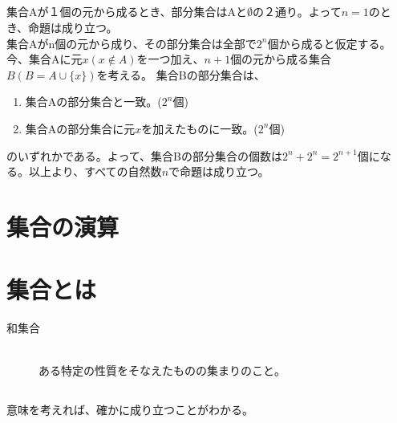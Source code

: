 \documentclass{jsarticle}
\begin{document}
\subsection{}
集合Aが１個の元から成るとき、部分集合はAと$\emptyset$の２通り。よって$n=1$のとき、命題は成り立つ。\\
集合Aがn個の元から成り、その部分集合は全部で$2^n$個から成ると仮定する。
今、集合Aに元$x(x\notin A)$を一つ加え、$n+1$個の元から成る集合$B(B=A\cup\{x\})$を考える。
集合Bの部分集合は、
\begin{enumerate}
\item 集合Aの部分集合と一致。($2^n$個)
\item 集合Aの部分集合に元$x$を加えたものに一致。($2^n$個)
\end{enumerate}
のいずれかである。よって、集合Bの部分集合の個数は$2^n+2^n=2^{n+1}$個になる。以上より、すべての自然数$n$で命題は成り立つ。

\section{集合の演算}
\section{集合とは}
\begin{screen}
\begin{description}
\item[和集合]\mbox{}\\ある特定の性質をそなえたものの集まりのこと。
\end{description}
\end{screen}

\subsection{}
意味を考えれば、確かに成り立つことがわかる。
\end{document}
